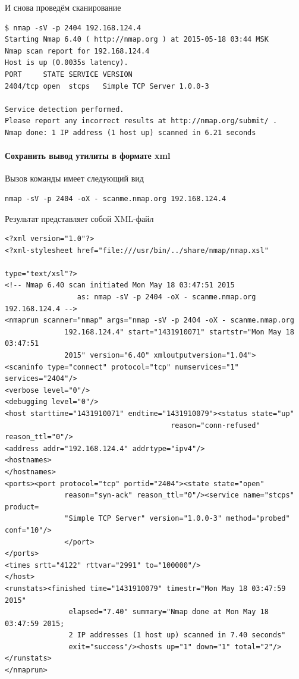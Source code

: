 \documentclass[a4paper, 12pt]{article}		%
\begin{document}
И снова проведём сканирование

\begin{Verbatim}[frame=single]
$ nmap -sV -p 2404 192.168.124.4
Starting Nmap 6.40 ( http://nmap.org ) at 2015-05-18 03:44 MSK
Nmap scan report for 192.168.124.4
Host is up (0.0035s latency).
PORT     STATE SERVICE VERSION
2404/tcp open  stcps   Simple TCP Server 1.0.0-3

Service detection performed. 
Please report any incorrect results at http://nmap.org/submit/ .
Nmap done: 1 IP address (1 host up) scanned in 6.21 seconds
\end{Verbatim}

\paragraph{Сохранить вывод утилиты в формате xml}

Вызов команды имеет следующий вид
\begin{Verbatim}[frame=single]
nmap -sV -p 2404 -oX - scanme.nmap.org 192.168.124.4
\end{Verbatim}

Результат представляет собой XML-файл
\begin{Verbatim}[frame=single]
<?xml version="1.0"?>
<?xml-stylesheet href="file:///usr/bin/../share/nmap/nmap.xsl"
                                                            type="text/xsl"?>
<!-- Nmap 6.40 scan initiated Mon May 18 03:47:51 2015
                 as: nmap -sV -p 2404 -oX - scanme.nmap.org 192.168.124.4 -->
<nmaprun scanner="nmap" args="nmap -sV -p 2404 -oX - scanme.nmap.org
              192.168.124.4" start="1431910071" startstr="Mon May 18 03:47:51
              2015" version="6.40" xmloutputversion="1.04">
<scaninfo type="connect" protocol="tcp" numservices="1" services="2404"/>
<verbose level="0"/>
<debugging level="0"/>
<host starttime="1431910071" endtime="1431910079"><status state="up"
                                       reason="conn-refused" reason_ttl="0"/>
<address addr="192.168.124.4" addrtype="ipv4"/>
<hostnames>
</hostnames>
<ports><port protocol="tcp" portid="2404"><state state="open"
              reason="syn-ack" reason_ttl="0"/><service name="stcps" product=
              "Simple TCP Server" version="1.0.0-3" method="probed" conf="10"/>
              </port>
</ports>
<times srtt="4122" rttvar="2991" to="100000"/>
</host>
<runstats><finished time="1431910079" timestr="Mon May 18 03:47:59 2015"
               elapsed="7.40" summary="Nmap done at Mon May 18 03:47:59 2015;
               2 IP addresses (1 host up) scanned in 7.40 seconds"
               exit="success"/><hosts up="1" down="1" total="2"/>
</runstats>
</nmaprun>
\end{Verbatim}
\end{document}
